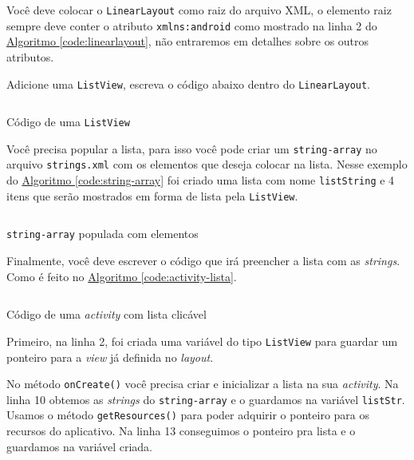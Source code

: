 \documentclass[a4paper,12pt,brazil,oneside]{book}
\begin{document}
Você deve colocar o \texttt{LinearLayout} como raiz do arquivo XML, o elemento raiz sempre deve conter o atributo \texttt{xmlns:android} como mostrado na linha 2 do \hyperref[code:linearlayout]{Algoritmo \ref*{code:linearlayout}}, não entraremos em detalhes sobre os outros atributos. 

Adicione uma \texttt{ListView}, escreva o código abaixo dentro do \texttt{LinearLayout}. 
\begin{listing}[H]
\inputminted[linenos=true,fontsize=\small,frame=lines, framesep=2mm, tabsize=2,numbersep=5pt]{xml}{src/design/listview.xml}
\caption{Código de uma \texttt{ListView}}
\end{listing}

Você precisa popular a lista, para isso você pode criar um \texttt{string-array} no arquivo \texttt{strings.xml} com os elementos que deseja colocar na lista. Nesse exemplo do \hyperref[code:string-array]{Algoritmo \ref*{code:string-array}} foi criado uma lista com nome \texttt{listString} e 4 itens que serão mostrados em forma de lista pela \texttt{ListView}.

\begin{listing}[H]
\inputminted[linenos=true,fontsize=\small,frame=lines, framesep=2mm, tabsize=2,numbersep=5pt]{xml}{src/design/string-array.xml}
\caption{\texttt{string-array} populada com elementos}
\label{code:string-array}
\end{listing}

Finalmente, você deve escrever o código que irá preencher a lista com as \emph{strings}. Como é feito no \hyperref[code:activity-lista]{Algoritmo \ref*{code:activity-lista}}.

\begin{listing}[H]
\inputminted[linenos=true,fontsize=\small,frame=lines, framesep=2mm, tabsize=2,numbersep=5pt]{java}{src/design/listactivity.java}
\caption{Código de uma \emph{activity} com lista clicável}
\label{code:activity-lista}
\end{listing}

Primeiro, na linha 2, foi criada uma variável do tipo \texttt{ListView} para guardar um ponteiro para a \emph{view} já definida no \emph{layout}.

No método \texttt{onCreate()} você precisa criar e inicializar a lista na sua \emph{activity}. Na linha 10 obtemos as \emph{strings} do \texttt{string-array} e o guardamos na variável \texttt{listStr}. Usamos o método \texttt{getResources()} para poder adquirir o ponteiro para os recursos do aplicativo. Na linha 13 conseguimos o ponteiro pra lista e o guardamos na variável criada.
\end{document}
